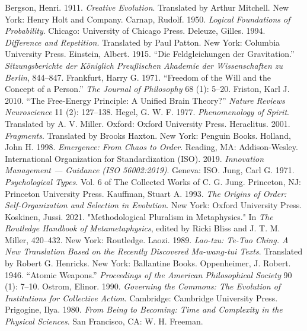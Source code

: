 \documentclass[11pt, a4paper]{article}
\begin{document}
\begin{thebibliography}{99}

 Bergson, Henri. 1911. \textit{Creative Evolution}. Translated by Arthur Mitchell. New York: Henry Holt and Company.
 Carnap, Rudolf. 1950. \textit{Logical Foundations of Probability}. Chicago: University of Chicago Press.
 Deleuze, Gilles. 1994. \textit{Difference and Repetition}. Translated by Paul Patton. New York: Columbia University Press.
 Einstein, Albert. 1915. “Die Feldgleichungen der Gravitation.” \textit{Sitzungsberichte der Königlich Preußischen Akademie der Wissenschaften zu Berlin}, 844–847.
 Frankfurt, Harry G. 1971. “Freedom of the Will and the Concept of a Person.” \textit{The Journal of Philosophy} 68 (1): 5–20.
 Friston, Karl J. 2010. “The Free-Energy Principle: A Unified Brain Theory?” \textit{Nature Reviews Neuroscience} 11 (2): 127–138.
 Hegel, G. W. F. 1977. \textit{Phenomenology of Spirit}. Translated by A. V. Miller. Oxford: Oxford University Press.
 Heraclitus. 2001. \textit{Fragments}. Translated by Brooks Haxton. New York: Penguin Books.
 Holland, John H. 1998. \textit{Emergence: From Chaos to Order}. Reading, MA: Addison-Wesley.
 International Organization for Standardization (ISO). 2019. \textit{Innovation Management — Guidance (ISO 56002:2019)}. Geneva: ISO.
 Jung, Carl G. 1971. \textit{Psychological Types}. Vol. 6 of The Collected Works of C. G. Jung. Princeton, NJ: Princeton University Press.
 Kauffman, Stuart A. 1993. \textit{The Origins of Order: Self-Organization and Selection in Evolution}. New York: Oxford University Press.
 Koskinen, Jussi. 2021. "Methodological Pluralism in Metaphysics." In \textit{The Routledge Handbook of Metametaphysics}, edited by Ricki Bliss and J. T. M. Miller, 420–432. New York: Routledge.
 Laozi. 1989. \textit{Lao-tzu: Te-Tao Ching. A New Translation Based on the Recently Discovered Ma-wang-tui Texts}. Translated by Robert G. Henricks. New York: Ballantine Books.
 Oppenheimer, J. Robert. 1946. “Atomic Weapons.” \textit{Proceedings of the American Philosophical Society} 90 (1): 7–10.
 Ostrom, Elinor. 1990. \textit{Governing the Commons: The Evolution of Institutions for Collective Action}. Cambridge: Cambridge University Press.
 Prigogine, Ilya. 1980. \textit{From Being to Becoming: Time and Complexity in the Physical Sciences}. San Francisco, CA: W. H. Freeman.

\end{thebibliography}
\end{document}
